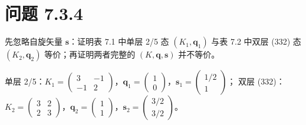 \section*{问题 7.3.4}
\begin{problem}
先忽略自旋矢量 $\pmb{s}$：证明表 7.1 中单层 2/5 态 $(K_1,\pmb{q}_1)$ 与表 7.2 中双层 (332) 态 $(K_2,\pmb{q}_2)$ 等价；再证明两者完整的 $(K,\pmb{q},\pmb{s})$ 并不等价。
\end{problem}
\solution
单层 2/5：$K_1=\begin{pmatrix}3&-1\\-1&2\end{pmatrix}$，$\pmb{q}_1=\begin{pmatrix}1\\0\end{pmatrix}$，$\pmb{s}_1=\begin{pmatrix}1/2\\1\end{pmatrix}$；
双层 (332)：$K_2=\begin{pmatrix}3&2\\2&3\end{pmatrix}$，$\pmb{q}_2=\begin{pmatrix}1\\1\end{pmatrix}$，$\pmb{s}_2=\begin{pmatrix}3/2\\3/2\end{pmatrix}$。


